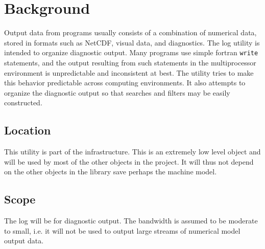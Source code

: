 

\section{Background}

Output data from programs usually consists of a combination of numerical data,
stored in formats such as NetCDF, visual data, and diagnostics.  The log 
utility is intended to organize diagnostic output.  Many programs use simple 
fortran {\tt write} statements, and the output resulting from such statements
in the multiprocessor environment is unpredictable and inconsistent at best.  
The utility tries to make this behavior predictable across computing 
environments.  It also attempts to organize the diagnostic output so that 
searches and filters may be easily constructed.

\subsection{Location}

This utility is part of the infrastructure.  This is an extremely low level 
object and will be used by most of the other objects in the project.  It will 
thus not depend on the other objects in the library save perhaps the machine 
model.

\subsection{Scope}

The log will be for diagnostic output.  The bandwidth is assumed to be moderate
to small, i.e. it will not be used to output large streams of numerical model 
output data.  



